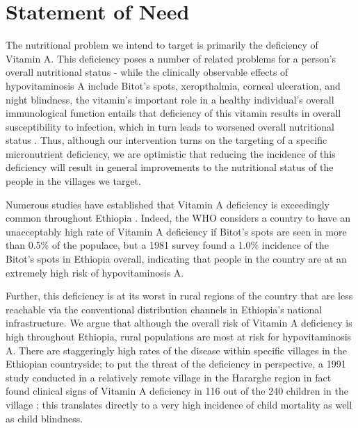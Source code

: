 \documentclass[12pt, letterpaper, draft]{article}
\begin{document}
\pagebreak
\setcounter{page}{1}

\doublespacing %

\section{Statement of Need} %

The nutritional problem we intend to target is primarily the deficiency of Vitamin A. This deficiency poses a number of related problems for a person's overall nutritional status - while the clinically observable effects of hypovitaminosis A include Bitot's spots, xeropthalmia, corneal ulceration, and night blindness, the vitamin's important role in a healthy individual's overall immunological function entails that deficiency of this vitamin results in overall susceptibility to infection, which in turn leads to worsened overall nutritional status \cite{underwood1978hypovitaminosis}. Thus, although our intervention turns on the targeting of a specific micronutrient deficiency, we are optimistic that reducing the incidence of this deficiency will result in general improvements to the nutritional status of the people in the villages we target.

Numerous studies have established that Vitamin A deficiency is exceedingly common throughout Ethiopia \cite{demissie2010magnitude}. Indeed, the WHO considers a country to have an unacceptably high rate of Vitamin A deficiency if Bitot's spots are seen in more than 0.5\% of the populace, but a 1981 survey found a 1.0\% incidence of the Bitot's spots in Ethiopia overall, indicating that people in the country are at an extremely high risk of hypovitaminosis A. 

Further, this deficiency is at its worst in rural regions of the country \cite{haidar1999malnutrition} that are less reachable via the conventional distribution channels in Ethiopia's national infrastructure. We argue that although the overall risk of Vitamin A deficiency is high throughout Ethiopia, rural populations are most at risk for hypovitaminosis A. There are staggeringly high rates of the disease within specific villages in the Ethiopian countryside; to put the threat of the deficiency in perspective, a 1991 study conducted in a relatively remote village in the Hararghe region in fact found clinical signs of Vitamin A deficiency in 116 out of the 240 children in the village \cite{wolde1993severe}; this translates directly to a very high incidence of child mortality as well as child blindness. 
\end{document}
